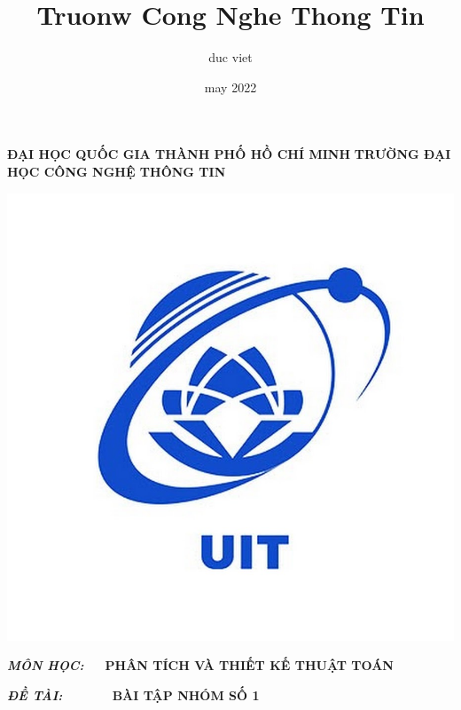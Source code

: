 \documentclass{article}
\title{Truonw Cong Nghe Thong Tin}
\author{duc viet}
\date{may 2022}
\begin{document}
\begin{titlepage}
    \begin{center}
        \vspace{5pt}
        \textbf{ĐẠI HỌC QUỐC GIA THÀNH PHỐ HỒ CHÍ MINH}
        \vspace{5pt}
        \textbf{TRƯỜNG ĐẠI HỌC CÔNG NGHỆ THÔNG TIN}
    \end{center}
    
    \vspace{5pt}
    
    \begin{center}
        \includegraphics[scale=0.3]{BT/UIT}
        \vspace{10pt}
        \fontsize{15pt}{15pt}\selectfont
    
        \begin{flushleft}
        \fontsize{15pt}{15pt}\selectfont  
        \textbf{\textsl{MÔN HỌC:}~~~{PHÂN TÍCH VÀ THIẾT KẾ THUẬT TOÁN}}
        \end{flushleft}
    \end{center}
    
    
    \begin{flushleft}
        \fontsize{15pt}{15pt}\selectfont  
        \textbf{\textsl{ĐỀ TÀI:}~~~~~~~{BÀI TẬP NHÓM SỐ 1}}
    \end{flushleft}
    

\end{titlepage}
\end{document}
